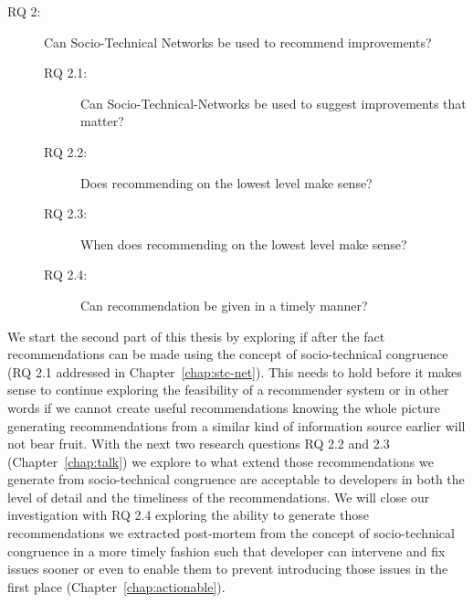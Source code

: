 \begin{description}
%
\item[RQ 2:] Can Socio-Technical Networks be used to recommend improvements? 
  \begin{description}
  \item[RQ 2.1:] Can Socio-Technical-Networks be used to suggest improvements that matter?
  \item[RQ 2.2:] Does recommending on the lowest level make sense?
  \item[RQ 2.3:] When does recommending on the lowest level make sense?
  \item[RQ 2.4:] Can recommendation be given in a timely manner?
  \end{description}
\end{description}

We start the second part of this thesis by exploring if after the fact recommendations can be made using the concept of socio-technical congruence (RQ 2.1 addressed in Chapter~\ref{chap:stc-net}).
This needs to hold before it makes sense to continue exploring the feasibility of a recommender system or in other words if we cannot create useful recommendations knowing the whole picture generating recommendations from a similar kind of information source earlier will not bear fruit.
With the next two research questions RQ 2.2 and 2.3 (Chapter~\ref{chap:talk}) we explore to what extend those recommendations we generate from socio-technical congruence are acceptable to developers in both the level of detail and the timeliness of the recommendations.
We will close our investigation with RQ 2.4 exploring the ability to generate those recommendations we extracted post-mortem from the concept of socio-technical congruence in a more timely fashion such that developer can intervene and fix issues sooner or even to enable them to prevent introducing those issues in the first place (Chapter~\ref{chap:actionable}). 

